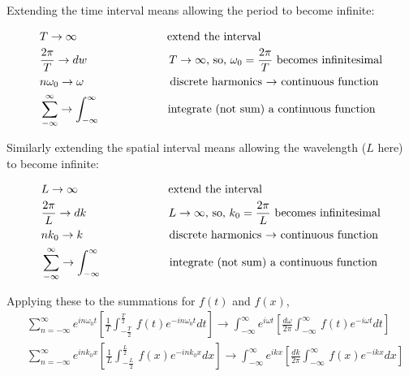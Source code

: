 \documentclass[12pt]{article}
\begin{document}
\begin{flushleft}
Extending the time interval means allowing the period to become infinite:

\begin{equation*}
\begin{aligned}
& T \rightarrow \infty \hspace{1.1in} \text{extend the interval}\\
& \frac{2\pi}{T} \rightarrow dw \hspace{1.in} \text{$T\rightarrow \infty$, so, $\omega_{0}=\frac{2\pi}{T}$ becomes infinitesimal}  \\
& n\omega_{0} \rightarrow \omega \hspace{1.05in} \text{discrete harmonics $\rightarrow$ continuous function}\\
&\sum_{-\infty}^{\infty} \rightarrow \int_{-\infty}^{\infty} \hspace{.82in} \text{integrate (not sum) a continuous function}
\end{aligned}
\end{equation*}

Similarly extending the spatial interval means allowing the wavelength ($L$ here) to become infinite:

\begin{equation*}
\begin{aligned}
& L \rightarrow \infty \hspace{1.1in} \text{extend the interval}\\
& \frac{2\pi}{L} \rightarrow dk \hspace{1.in} \text{$L\rightarrow \infty$, so, $k_{0}=\frac{2\pi}{L}$ becomes infinitesimal}  \\
& nk_{0} \rightarrow k \hspace{1.05in} \text{discrete harmonics $\rightarrow$ continuous function}\\
&\sum_{-\infty}^{\infty} \rightarrow \int_{-\infty}^{\infty} \hspace{.82in} \text{integrate (not sum) a continuous function}
\end{aligned}
\end{equation*}


Applying these to the summations for $f(t)$ and $f(x)$,
\begin{equation*}
\begin{aligned}
& \sum_{n=-\infty}^{\infty} e^{in\omega_{0}t} \left[ \frac{1}{T} \int_{-\frac{T}{2}}^{\frac{T}{2}} \, f(t)e^{-in\omega_{0}t} dt \right] \longrightarrow \int_{-\infty}^{\infty} e^{i\omega t} \left[ \frac{d\omega}{2\pi} \int_{-\infty}^{\infty} \, f(t)e^{-i\omega t} dt \right] \\
& \sum_{n=-\infty}^{\infty} e^{ink_{0}x} \left[ \frac{1}{L} \int_{-\frac{L}{2}}^{\frac{L}{2}} \, f(x)e^{-ink_{0}x} dx \right]  \longrightarrow \int_{-\infty}^{\infty} e^{ikx} \left[ \frac{dk}{2\pi} \int_{-\infty}^{\infty} \, f(x)e^{-ikx} dx \right] 
\end{aligned}
\end{equation*}


\end{flushleft}
\end{document}
